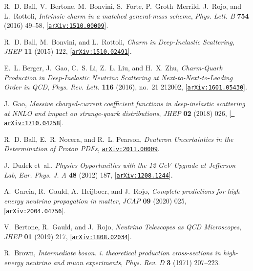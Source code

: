 \documentclass[11pt,a4paper]{article}
\begin{document}
\begin{thebibliography}{10}
  R.~D. Ball, V.~Bertone, M.~Bonvini, S.~Forte, P.~Groth~Merrild, J.~Rojo, and
    L.~Rottoli, {\it {Intrinsic charm in a matched general-mass scheme}},  {\em
    Phys. Lett. B} {\bf 754} (2016) 49--58,
    [\href{http://arxiv.org/abs/1510.00009}{{\tt arXiv:1510.00009}}].
  
  R.~D. Ball, M.~Bonvini, and L.~Rottoli, {\it {Charm in Deep-Inelastic
    Scattering}},  {\em JHEP} {\bf 11} (2015) 122,
    [\href{http://arxiv.org/abs/1510.02491}{{\tt arXiv:1510.02491}}].
  
  E.~L. Berger, J.~Gao, C.~S. Li, Z.~L. Liu, and H.~X. Zhu, {\it {Charm-Quark
    Production in Deep-Inelastic Neutrino Scattering at Next-to-Next-to-Leading
    Order in QCD}},  {\em Phys. Rev. Lett.} {\bf 116} (2016), no.~21 212002,
    [\href{http://arxiv.org/abs/1601.05430}{{\tt arXiv:1601.05430}}].
  
  J.~Gao, {\it {Massive charged-current coefficient functions in deep-inelastic
    scattering at NNLO and impact on strange-quark distributions}},  {\em JHEP}
    {\bf 02} (2018) 026, [\href{http://arxiv.org/abs/1710.04258}{{\tt
    arXiv:1710.04258}}].
  
  R.~D. Ball, E.~R. Nocera, and R.~L. Pearson, {\it {Deuteron Uncertainties in
    the Determination of Proton PDFs}},
    \href{http://arxiv.org/abs/2011.00009}{{\tt arXiv:2011.00009}}.
  
  J.~Dudek et~al., {\it {Physics Opportunities with the 12 GeV Upgrade at
    Jefferson Lab}},  {\em Eur. Phys. J. A} {\bf 48} (2012) 187,
    [\href{http://arxiv.org/abs/1208.1244}{{\tt arXiv:1208.1244}}].
  
  A.~Garcia, R.~Gauld, A.~Heijboer, and J.~Rojo, {\it {Complete predictions for
    high-energy neutrino propagation in matter}},  {\em JCAP} {\bf 09} (2020)
    025, [\href{http://arxiv.org/abs/2004.04756}{{\tt arXiv:2004.04756}}].
  
  V.~Bertone, R.~Gauld, and J.~Rojo, {\it {Neutrino Telescopes as QCD
    Microscopes}},  {\em JHEP} {\bf 01} (2019) 217,
    [\href{http://arxiv.org/abs/1808.02034}{{\tt arXiv:1808.02034}}].
  
  R.~Brown, {\it {Intermediate boson. i. theoretical production cross-sections in
    high-energy neutrino and muon experiments}},  {\em Phys. Rev. D} {\bf 3}
    (1971) 207--223.
  

\end{thebibliography}
\end{document}
